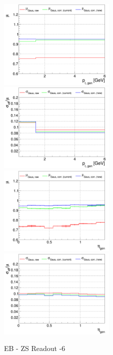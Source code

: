 \begin{figure}
\includegraphics[width=0.495\textwidth]{./plots_pdf/ECAL_plots/plotsPU/EB/ZS/pdf/GENPT/EBZS_GENPT_0000_0006_MuOverBins.pdf}
\includegraphics[width=0.495\textwidth]{./plots_pdf/ECAL_plots/plotsPU/EB/ZS/pdf/GENPT/EBZS_GENPT_0000_0006_EffSigmaOverBins.pdf}
\includegraphics[width=0.495\textwidth]{./plots_pdf/ECAL_plots/plotsPU/EB/ZS/pdf/GENETA/EBZS_GENETA_0000_0006_MuOverBins.pdf}
\includegraphics[width=0.495\textwidth]{./plots_pdf/ECAL_plots/plotsPU/EB/ZS/pdf/GENETA/EBZS_GENETA_0000_0006_EffSigmaOverBins.pdf}
\caption{EB - ZS Readout -6}


\end{figure}
